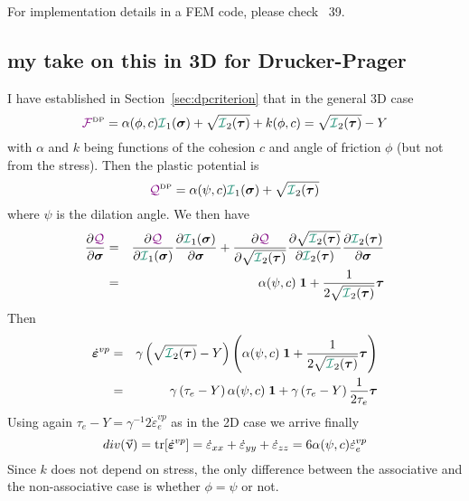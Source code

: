 For implementation details in a FEM code, please check \stone~39. 

\subsection{my take on this in 3D for Drucker-Prager}

I have established in Section~\ref{sec:dpcriterion} that in the general 3D case
\begin{equation}
\FFF^{\text{\tiny DP}}= \alpha(\phi,c) {\III}_1({\bm \sigma}) + \sqrt{ {\III}_2({\bm \tau})  } + k(\phi,c) 
=\sqrt{  {\III}_2({\bm \tau})  } -Y 
\end{equation}
with $\alpha$ and $k$ being functions of the cohesion $c$ and angle of friction $\phi$ 
(but not from the stress). Then the plastic potential is
\begin{equation}
\QQQ^{\text{\tiny DP}}= \alpha(\psi,c) {\III}_1({\bm \sigma})   +  \sqrt{  {\III}_2({\bm \tau})  } 
\end{equation}
where $\psi$ is the dilation angle.
We then have
\begin{eqnarray}
\frac{\partial \QQQ}{\partial \bm\sigma} 
&=&
\frac{\partial \QQQ}{\partial {\III}_1(\bm\sigma)} 
\frac{\partial {\III}_1(\bm\sigma)}{\partial \bm\sigma} 
+
\frac{\partial \QQQ}{\partial \sqrt{{\III}_2(\bm\tau)}} 
\frac{\partial \sqrt{ {\III}_2(\bm\tau)}   }{\partial {\III}_2(\bm\tau)} 
\frac{\partial {\III}_2(\bm\tau)}{\partial \bm\sigma} \nn\\
&=&
\alpha(\psi,c) \; {\bm 1} + \frac{1}{2 \sqrt{ {\III}_2(\bm\tau)}} 
\bm\tau
\end{eqnarray}
Then 
\begin{eqnarray}
\dot{\bm \varepsilon}^{vp} 
&=& \gamma \left(\sqrt{{\III}_2(\bm\tau)} - Y \right)
\left(\alpha(\psi,c) \;  {\bm 1} + \frac{1}{2 \sqrt{{\III}_2(\bm \tau)}} {\bm \tau} \right) \nn\\
&=& \gamma \left(\tau_e - Y \right)
\alpha(\psi,c) \;  {\bm 1} 
+  
\gamma \left(\tau_e - Y \right)
\frac{1}{2 \tau_e} {\bm \tau}  
\end{eqnarray}
Using again $\tau_e - Y = \gamma^{-1} 2  \dot\varepsilon_e^{vp}$ as in the 2D case 
we arrive finally
\[
div (\vec\upnu)=
{\rm tr}[\dot{\bm \varepsilon}^{vp}]=
\dot{\varepsilon}_{xx}
+
\dot{\varepsilon}_{yy}
+
\dot{\varepsilon}_{zz}
=
6 \alpha(\psi,c) \dot\varepsilon_e^{vp}
\]
Since $k$ does not depend on stress, the only difference between the associative
and the non-associative case is whether $\phi=\psi$ or not.

